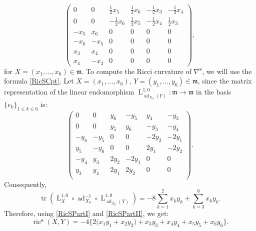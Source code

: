 \documentclass[preprint,12pt,1p]{elsarticle}
\theoremstyle{plain}
\theoremstyle{definition}
\newcommand{\ro}{\circ}
\newcommand{\n}{\nabla}
\newcommand{\ns}{\n^\mathbf{s}}
\newcommand{\tr}{\operatorname{tr}}
\newcommand{\ad}{\operatorname{ad}}
\newcommand{\lm}{\operatorname{L}^{1,0}}
\newcommand{\ric}{\operatorname{ric}}
\numberwithin{equation}{section}
\newcommand{\Aa}{x_1}
\newcommand{\Ba}{x_2}
\newcommand{\Ab}{x_3}
\newcommand{\Bb}{x_4}
\newcommand{\Ac}{x_5}
\newcommand{\Bc}{x_6}
\newcommand{\Ca}{y_1}
\newcommand{\Da}{y_2}
\newcommand{\Cb}{y_3}
\newcommand{\Db}{y_4}
\newcommand{\Cc}{y_5}
\newcommand{\Dc}{y_6}
\begin{document}
\begin{equation}\label{LsSU3}
\begin{pmatrix}
0&0&\tfrac{1}{2}x_5&\tfrac{1}{2}x_6&-\tfrac{1}{2}x_3&-\tfrac{1}{2}x_4\\
0&0&-\tfrac{1}{2}x_6&\tfrac{1}{2}x_5&-\tfrac{1}{2}x_4&\tfrac{1}{2}x_3\\
-x_5&x_6&0&0&0&0\\
-x_6&-x_5&0&0&0&0\\
x_3&x_4&0&0&0&0\\
x_4&-x_3&0&0&0&0
\end{pmatrix},
\end{equation}
for $X=(x_1,\ldots,x_6)\in\mathfrak{m}$. To compute the Ricci curvature of $\ns$, we will use the formula \eqref{RicSCpt}. Let $X=(\Aa,\ldots,\Bc),\, Y=(\Ca,\ldots,\Dc)\in\mathfrak{m}$, since the matrix representation of the linear endomorphism $\lm_{\ad_{X_0}(Y)}:\mathfrak{m}\to\mathfrak{m}$ in the basis $\{e_k\}_{1\leqslant k\leqslant 6}$ is:
\begin{equation*}
\begin{pmatrix}
0&0&y_6&-y_5&y_4&-y_3\\
0&0&y_5&y_6&-y_3&-y_4\\
-y_6&-y_5&0&0&-2 y_2&-2 y_1\\
y_5&-y_6&0&0&2 y_1&-2 y_2\\
-y_4&y_3&2 y_2&-2 y_1&0&0\\
y_3&y_4&2 y_1&2 y_2&0&0\\
\end{pmatrix}.
\end{equation*}
Consequently,
\begin{equation}\label{RicSPartII}
\tr\left(\lm_X\ro\ad_{X_0}^{-1}\ro\lm_{\ad_{X_0}(Y)}\right)=-8\sum_{k=1}^2x_ky_k+\sum_{k=3}^6x_ky_k.
\end{equation}
Therefore, using \eqref{RicSPartI} and \eqref{RicSPartII}, we get:
\begin{equation*}
\ric^\mathbf{s}(X,Y)=-4\Big\{2\big(\Aa\Ca+\Ba\Da\big)+\Ab\Cb+\Bb\Db+\Ac\Cc+\Bc\Dc\Big\}.
\end{equation*}
\end{document}
